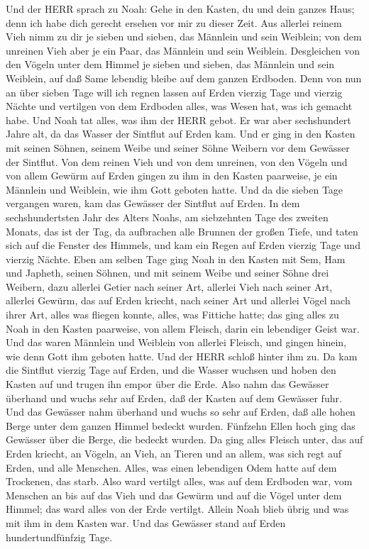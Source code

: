 Und der HERR sprach zu Noah: Gehe in den Kasten, du und
dein ganzes Haus; denn ich habe dich gerecht ersehen vor mir zu dieser
Zeit.  Aus allerlei reinem Vieh nimm zu dir je sieben und
sieben, das Männlein und sein Weiblein; von dem unreinen Vieh aber je
ein Paar, das Männlein und sein Weiblein.  Desgleichen von
den Vögeln unter dem Himmel je sieben und sieben, das Männlein und sein
Weiblein, auf daß Same lebendig bleibe auf dem ganzen Erdboden.
 Denn von nun an über sieben Tage will ich regnen lassen auf
Erden vierzig Tage und vierzig Nächte und vertilgen von dem Erdboden
alles, was Wesen hat, was ich gemacht habe.  Und Noah tat
alles, was ihm der HERR gebot.  Er war aber sechshundert
Jahre alt, da das Wasser der Sintflut auf Erden kam.  Und er
ging in den Kasten mit seinen Söhnen, seinem Weibe und seiner Söhne
Weibern vor dem Gewässer der Sintflut.  Von dem reinen Vieh
und von dem unreinen, von den Vögeln und von allem Gewürm auf Erden
 gingen zu ihm in den Kasten paarweise, je ein Männlein und
Weiblein, wie ihm Gott geboten hatte.  Und da die sieben
Tage vergangen waren, kam das Gewässer der Sintflut auf Erden.
 In dem sechshundertsten Jahr des Alters Noahs, am
siebzehnten Tage des zweiten Monats, das ist der Tag, da aufbrachen alle
Brunnen der großen Tiefe, und taten sich auf die Fenster des Himmels,
 und kam ein Regen auf Erden vierzig Tage und vierzig
Nächte.  Eben am selben Tage ging Noah in den Kasten mit
Sem, Ham und Japheth, seinen Söhnen, und mit seinem Weibe und seiner
Söhne drei Weibern,  dazu allerlei Getier nach seiner Art,
allerlei Vieh nach seiner Art, allerlei Gewürm, das auf Erden kriecht,
nach seiner Art und allerlei Vögel nach ihrer Art, alles was fliegen
konnte, alles, was Fittiche hatte;  das ging alles zu Noah
in den Kasten paarweise, von allem Fleisch, darin ein lebendiger Geist
war.  Und das waren Männlein und Weiblein von allerlei
Fleisch, und gingen hinein, wie denn Gott ihm geboten hatte. Und der
HERR schloß hinter ihm zu.  Da kam die Sintflut vierzig
Tage auf Erden, und die Wasser wuchsen und hoben den Kasten auf und
trugen ihn empor über die Erde.  Also nahm das Gewässer
überhand und wuchs sehr auf Erden, daß der Kasten auf dem Gewässer fuhr.
 Und das Gewässer nahm überhand und wuchs so sehr auf
Erden, daß alle hohen Berge unter dem ganzen Himmel bedeckt wurden.
 Fünfzehn Ellen hoch ging das Gewässer über die Berge, die
bedeckt wurden.  Da ging alles Fleisch unter, das auf Erden
kriecht, an Vögeln, an Vieh, an Tieren und an allem, was sich regt auf
Erden, und alle Menschen.  Alles, was einen lebendigen Odem
hatte auf dem Trockenen, das starb.  Also ward vertilgt
alles, was auf dem Erdboden war, vom Menschen an bis auf das Vieh und
das Gewürm und auf die Vögel unter dem Himmel; das ward alles von der
Erde vertilgt. Allein Noah blieb übrig und was mit ihm in dem Kasten
war.  Und das Gewässer stand auf Erden hundertundfünfzig
Tage.

